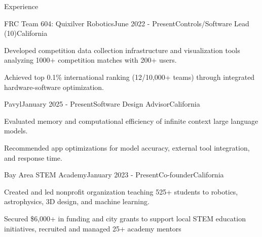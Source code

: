 \documentclass[
  10pt, %
]{resume}
\begin{document}
\begin{rSection}{Experience}
\begin{rSubsection}{FRC Team 604: Quixilver Robotics}{June 2022 - Present}{Controls/Software Lead (10)}{California}
    \item Developed competition data collection infrastructure and visualization tools analyzing 1000+ competition matches with 200+ users.
    
    \item Achieved top 0.1\% international ranking (12/10,000+ teams) through integrated hardware-software optimization.
    
  \end{rSubsection}
        
  \begin{rSubsection}{Pavyl}{January 2025 - Present}{Software Design Advisor}{California}
    
    \item Evaluated memory and computational efficiency of infinite context large language models.
    
    \item Recommended app optimizations for model accuracy, external tool integration, and response time.
    
  \end{rSubsection}
        
  \begin{rSubsection}{Bay Area STEM Academy}{January 2023 - Present}{Co-founder}{California}
    
    \item Created and led nonprofit organization teaching 525+ students to robotics, astrophysics, 3D design, and machine learning.
    
    \item Secured \$6,000+ in funding and city grants to support local STEM education initiatives, recruited and managed 25+ academy mentors
    
  \end{rSubsection}
        
	
\end{rSection}

\end{document}
